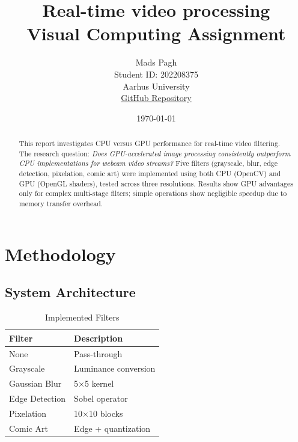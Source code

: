 \documentclass[12pt,a4paper]{article}
\title{Real-time video processing\\
\large Visual Computing Assignment}
\author{Mads Pagh\\
Student ID: 202208375\\
Aarhus University\\
\href{https://github.com/Zyzzava/Live-Camera-Streaming-and-Image-Filters-in-OpenCV}{GitHub Repository}}
\date{\today}
\begin{document}
\maketitle
\newpage

\begin{abstract}
This report investigates CPU versus GPU performance for real-time video filtering. The research question: \textit{Does GPU-accelerated image processing consistently outperform CPU implementations for webcam video streams?} Five filters (grayscale, blur, edge detection, pixelation, comic art) were implemented using both CPU (OpenCV) and GPU (OpenGL shaders), tested across three resolutions. Results show GPU advantages only for complex multi-stage filters; simple operations show negligible speedup due to memory transfer overhead.
\end{abstract}

\tableofcontents
\newpage

\section{Methodology}

\subsection{System Architecture}
\begin{table}
    \centering
    \caption{Implemented Filters}
    \label{tab:filters}
    \begin{tabular}{ll}
        \toprule
        \textbf{Filter} & \textbf{Description} \\
        \midrule
        None & Pass-through \\
        Grayscale & Luminance conversion \\
        Gaussian Blur & 5×5 kernel \\
        Edge Detection & Sobel operator \\
        Pixelation & 10×10 blocks \\
        Comic Art & Edge + quantization \\
        \bottomrule
    \end{tabular}
\end{table}
\end{document}

